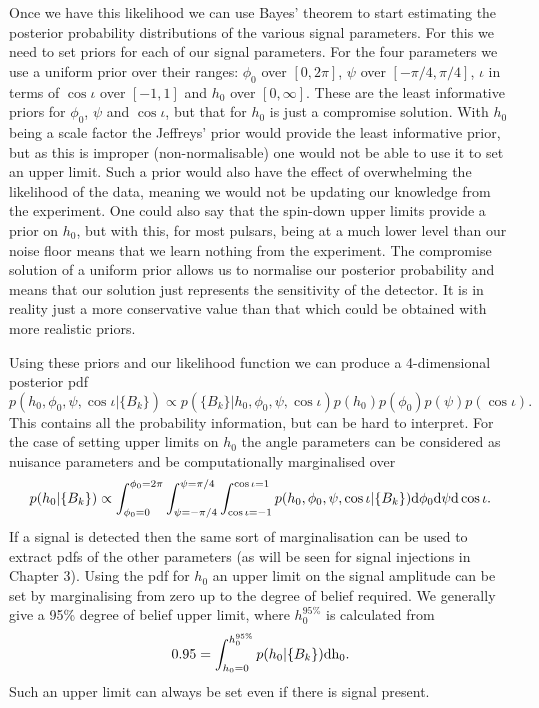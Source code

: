 Once we have this likelihood we can use Bayes' theorem to start estimating the posterior probability
distributions of the various signal parameters. For this we need to set priors for each of our
signal parameters. For the four parameters we use a uniform prior over their ranges: $\phi_0$ over
$[0, 2\pi]$, $\psi$ over $[-\pi/4, \pi/4]$, $\iota$ in terms of $\cos\iota$ over $[-1,1]$ and $h_0$
over $[0,\infty]$. These are the least informative priors for $\phi_0$, $\psi$ and $\cos\iota$, but
that for $h_0$ is just a compromise solution. With $h_0$ being a scale factor the Jeffreys' prior
would provide the least informative prior, but as this is improper (non-normalisable) one
would not be able to use it to set an upper limit. Such a prior would also have the effect of
overwhelming the likelihood of the data, meaning we would not be updating our knowledge from the
experiment. One could also say that the spin-down upper limits provide a prior on $h_0$, but with
this, for most pulsars, being at a much lower level than our noise floor means that we learn
nothing from the experiment. The compromise solution of a uniform prior allows us to normalise
our posterior probability and means that our solution just represents the sensitivity of the
detector. It is in reality just a more conservative value than that which could be obtained with
more realistic priors.

Using these priors and our likelihood function we can produce a 4-dimensional posterior pdf
\begin{equation}
p(h_0,\phi_0,\psi,\cos{\iota}|\{B_k\}) \propto p(\{B_k\}|h_0,\phi_0,\psi,\cos{\iota}) p(h_0)
p(\phi_0) p(\psi) p(\cos{\iota}).
\end{equation}
This contains all the probability information, but can be hard to interpret. For the case of setting
upper limits on $h_0$ the angle parameters can be considered as nuisance parameters and be
computationally marginalised over
\begin{equation}\label{margoverall}
p(h_0|\{B_k\}) \propto \int_{\phi_0 = 0}^{\phi_0 = 2\pi}\int_{\psi = -\pi/4}^{\psi =
\pi/4}\int_{\cos{\iota} = -1}^{\cos{\iota} = 1}  p(h_0,\phi_0,\psi,\cos{\iota}|\{B_k\}) \rm{d}\phi_0
\rm{d}\psi \rm{d}\cos{\iota}.
\end{equation}
If a signal is detected then the same sort of marginalisation can be used to extract pdfs of the
other parameters (as will be seen for signal injections in Chapter 3). Using the pdf for $h_0$
an upper limit on the signal amplitude can be set by marginalising from zero up to the degree of
belief required. We generally give a 95\% degree of belief upper limit, where $h_0^{95\%}$ is
calculated from
\begin{equation}\label{UpperLimit}
0.95 = \int_{h_0 = 0}^{h_0^{95\%}} p(h_0|\{B_k\})\rm{d}h_0.
\end{equation}
Such an upper limit can always be set even if there is signal present.


